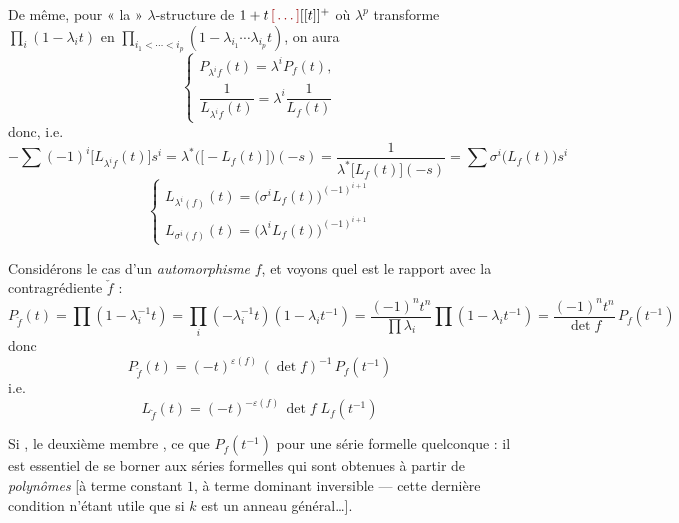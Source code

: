 \documentclass[11pt,a4paper]{article}
\begin{document}
De même, pour « la » $\lambda$-structure de $1 + t\,\ill{}[[t]]^{+}$ où
 $\lambda^p$ transforme $\prod_i (1 - \lambda_i t)$ en
$\prod_{i_1 < \cdots < i_p} (1 - \lambda_{i_1} \cdots \lambda_{i_p} t)$, on
aura
\[
  \left\lbrace
  \begin{array}{l}
    P_{\lambda^i f}(t) = \lambda^i P_f(t) , \\[6pt]
    \dfrac{1}{L_{\lambda^i f}(t)} = \lambda^i \dfrac{1}{L_f(t)}
  \end{array}
  \right.
\]
donc, i.e.
\[
  -\sum (-1)^i \bigl[L_{\lambda^i f}(t)\bigr] s^i
    = \lambda^{*}\bigl(\bigl[-L_f(t)\bigr]\bigr)(-s)
    = \frac{1}{\lambda^{*}\bigl[L_f(t)\bigr](-s)}
    = \sum \sigma^i\bigl(L_f(t)\bigr) s^i
\]
\[
  \left\lbrace
  \begin{array}{l}
    L_{\lambda^i(f)}(t) = \bigl(\sigma^i L_f(t)\bigr)^{(-1)^{i+1}} \\[4pt]
    L_{\sigma^i(f)}(t) = \bigl(\lambda^i L_f(t)\bigr)^{(-1)^{i+1}}
  \end{array}
  \right.
\]

Considérons le cas d'un \emph{automorphisme} $f$, et voyons quel est le
rapport avec la contragrédiente $\check f$ :
\[
  P_{\check f}(t) = \prod (1 - \lambda_i^{-1} t)
  = \prod_i (-\lambda_i^{-1} t)(1 - \lambda_i t^{-1})
  = \frac{(-1)^n t^n}{\prod \lambda_i} \prod (1 - \lambda_i t^{-1})
  = \frac{(-1)^n t^n}{\det f}\, P_f(t^{-1})
\]
donc
\[
  \boxed{P_{\check f}(t) = (-t)^{\varepsilon(f)} \, (\det f)^{-1} \, P_f(t^{-1})}
\]
i.e.
\[
  \boxed{L_{\check f}(t) = (-t)^{-\varepsilon(f)} \, \det f \; L_f(t^{-1})}
\]

Si \ill{}, le deuxième membre \ill{} \ill{}, \ill{} ce que
 $P_f(t^{-1})$ pour une série formelle quelconque :
il est essentiel de se borner aux séries formelles qui sont
 obtenues à partir de \emph{polynômes} [à terme
constant $1$, à terme dominant inversible --- cette dernière condition n'étant
utile que si $k$ est un anneau général\ldots].
\end{document}
